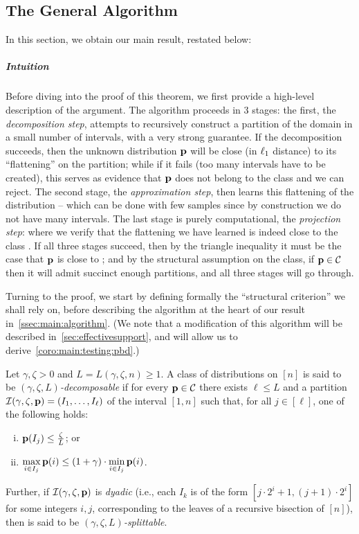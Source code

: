 \subsection{The General Algorithm}\label{sec:algorithm}
In this section, we obtain our main result, restated below:
\mainthmtestingalgo*

\subparagraph{Intuition} Before diving into the proof of this theorem, we first provide a high-level description of the argument. The algorithm proceeds in 3 stages: the first, the \emph{decomposition step}, attempts to recursively construct a partition of the domain in a small number of intervals, with a very strong guarantee. If the decomposition succeeds, then the unknown distribution $\D$ will be close (in $\lp[1]$ distance) to its ``flattening'' on the partition; while if it fails (too many intervals have to be created), this serves as evidence that $\D$ does not belong to the class and we can reject. The second stage, the \emph{approximation step}, then learns this flattening of the distribution -- which can be done with few samples since by construction we do not have many intervals. The last stage is purely computational, the \emph{projection step}: where we verify that the flattening we have learned is indeed close to the class \class. If all three stages succeed, then by the triangle inequality it must be the case that $\D$ is close to \class; and by the structural assumption on the class, if $\D\in\class$ then it will admit succinct enough partitions, and all three stages will go through.\medskip

\noindent Turning to the proof, we start by defining formally the ``structural criterion'' we shall rely on, before describing the algorithm at the heart of our result in~\cref{ssec:main:algorithm}. (We note that a modification of this algorithm will be described in~\cref{sec:effectivesupport}, and will allow us to derive~\cref{coro:main:testing:pbd}.)

\begin{definition}[Decompositions]\label{def:struct:dec:split}
Let $\gamma,  \zeta > 0$ and $L=L(\gamma,\zeta,n)\geq 1$.  A class of distributions \class on $[n]$ is said to be \emph{$(\gamma,\zeta,L)$-decomposable} if for every $\D\in\class$ there exists $\ell \leq L$ and a partition $\mathcal{I}(\gamma,\zeta,\D)=(I_1,\dots,I_\ell)$ of the interval $[1,n]$ such that, for all $j\in[\ell]$, one of the following holds:
\begin{enumerate}[(i)]
  \item\label{def:struct:item:light}  $\D(I_j) \leq \frac{\zeta}{L}$; or 
  \item\label{def:struct:item:flat} $\displaystyle \max_{i \in I_j} \D(i)\leq  (1+\gamma)\cdot \min_{i \in I_j} \D(i)$.
\end{enumerate}
Further, if $\mathcal{I}(\gamma,\zeta,\D)$ is \emph{dyadic} (i.e., each $I_k$ is of the form $[j\cdot 2^i+1,(j+1)\cdot 2^i]$ for some integers $i,j$, corresponding to the leaves of a recursive bisection of $[n]$), then \class is said to be \emph{$(\gamma,\zeta,L)$-splittable}.
\end{definition}

